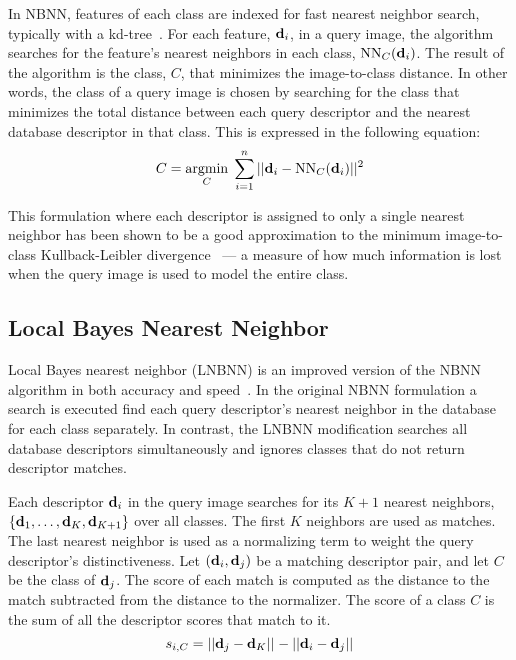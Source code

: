         In NBNN, features of each class are indexed for fast nearest
          neighbor search, typically with a
          kd-tree~\cite{bentley_multidimensional_1975}.
        For each feature, $\mathbf{d}_i$, in a query image, the algorithm
          searches for the feature's nearest neighbors in each class,
          $\operatorname{NN}_C(\mathbf{d}_i)$.
        The result of the algorithm is the class, $C$, that minimizes
          the image-to-class distance.
        In other words, the class of a query image is chosen by
          searching for the class that minimizes the total distance
          between each query descriptor and the nearest database
          descriptor in that class.
        This is expressed in the following equation:
        \begin{equation}
            C = \underset{C}{\operatorname{argmin}}\; \sum_{i=1}^n ||\mathbf{d}_i - \operatorname{NN}_C(\mathbf{d}_i)||^2
        \end{equation}

        This formulation where each descriptor is assigned to only a
          single nearest neighbor has been shown to be a good
          approximation to the minimum image-to-class Kullback-Leibler
          divergence~\cite{boiman_defense_2008} --- a measure of how much
          information is lost when the query image is used to model the
          entire class.

    \subsection{Local \Naive{} Bayes Nearest Neighbor}\label{sec:lnbnn}  

        Local \Naive{} Bayes nearest neighbor (LNBNN) is an improved
          version of the NBNN algorithm in both accuracy and
          speed~\cite{mccann_local_2012}.
        In the original NBNN formulation a search is executed find each
          query descriptor's nearest neighbor in the database for each
          class separately.
        In contrast, the LNBNN modification searches all database
          descriptors simultaneously and ignores classes that do not
          return descriptor matches.
        
        Each descriptor $\mathbf{d}_i$ in the query image searches for its
          $K+1$ nearest neighbors, $\{\mathbf{d}_1, \ldots, \mathbf{d}_K, \mathbf{d}_{K
          + 1}\}$ over all classes.
        The first $K$ neighbors are used as matches.
        The last nearest neighbor is used as a normalizing term to
          weight the query descriptor's distinctiveness.
        Let $(\mathbf{d}_i, \mathbf{d}_j)$ be a matching descriptor pair, and let
          $C$ be the class of $\mathbf{d}_j$.
        The score of each match is computed as the distance to the
          match subtracted from the distance to the normalizer.
        The score of a class $C$ is the sum of all the descriptor
          scores that match to it.
        \begin{equation}
            s_{i, C} = ||\mathbf{d}_j - \mathbf{d}_K||_{} - ||\mathbf{d}_i - \mathbf{d}_j||_{}
        \end{equation}

